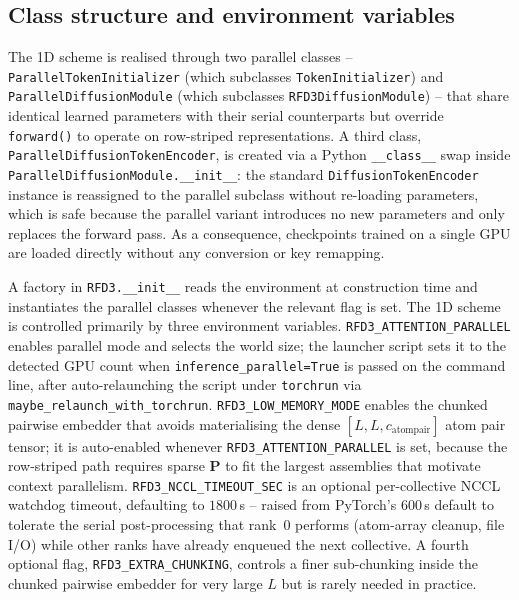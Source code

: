 \documentclass{article}
\theoremstyle{plain}
\theoremstyle{definition}
\theoremstyle{remark}
\begin{document}
\subsection{Class structure and environment variables}
\label{app:implementation}

The 1D scheme is realised through two parallel classes -- \texttt{ParallelTokenInitializer} (which subclasses \texttt{TokenInitializer}) and \texttt{ParallelDiffusionModule} (which subclasses \texttt{RFD3DiffusionModule}) -- that share identical learned parameters with their serial counterparts but override \texttt{forward()} to operate on row-striped representations. A third class, \texttt{ParallelDiffusionTokenEncoder}, is created via a Python \texttt{\_\_class\_\_} swap inside \texttt{ParallelDiffusionModule.\_\_init\_\_}: the standard \texttt{DiffusionTokenEncoder} instance is reassigned to the parallel subclass without re-loading parameters, which is safe because the parallel variant introduces no new parameters and only replaces the forward pass. As a consequence, checkpoints trained on a single GPU are loaded directly without any conversion or key remapping.

A factory in \texttt{RFD3.\_\_init\_\_} reads the environment at construction time and instantiates the parallel classes whenever the relevant flag is set. The 1D scheme is controlled primarily by three environment variables. \texttt{RFD3\_ATTENTION\_PARALLEL} enables parallel mode and selects the world size; the launcher script sets it to the detected GPU count when \texttt{inference\_parallel=True} is passed on the command line, after auto-relaunching the script under \texttt{torchrun} via \texttt{maybe\_relaunch\_with\_torchrun}. \texttt{RFD3\_LOW\_MEMORY\_MODE} enables the chunked pairwise embedder that avoids materialising the dense $[L,L,c_\text{atompair}]$ atom pair tensor; it is auto-enabled whenever \texttt{RFD3\_ATTENTION\_PARALLEL} is set, because the row-striped path requires sparse $\mathbf{P}$ to fit the largest assemblies that motivate context parallelism. \texttt{RFD3\_NCCL\_TIMEOUT\_SEC} is an optional per-collective NCCL watchdog timeout, defaulting to $1800$\,s -- raised from PyTorch's $600$\,s default to tolerate the serial post-processing that rank~$0$ performs (atom-array cleanup, file I/O) while other ranks have already enqueued the next collective. A fourth optional flag, \texttt{RFD3\_EXTRA\_CHUNKING}, controls a finer sub-chunking inside the chunked pairwise embedder for very large $L$ but is rarely needed in practice.
\end{document}
